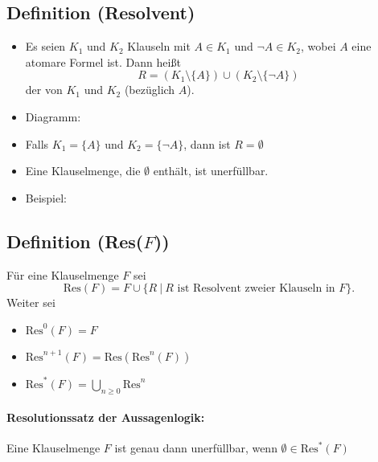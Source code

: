 \documentclass[a4paper,twoside,DIV15,BCOR12mm]{scrbook}
\begin{document}
\subsection{Definition (Resolvent)}
\begin{itemize}
\item Es seien $K_1$ und $K_2$ Klauseln mit $A\in K_1$ und $\neg A \in K_2$, 
    wobei $A$ eine atomare Formel ist. Dann heißt 
    $$ R=(K_1 \setminus \{A\}) \cup (K_2 \setminus \{\neg A\}) $$ der  von 
    $K_1$ und $K_2$ (bezüglich $A$).
\item Diagramm: \\

\item Falls $K_1 =\{A\}$ und $K_2=\{\neg A\}$, dann ist $R= \emptyset$
\item Eine Klauselmenge, die $\emptyset$ enthält, ist unerfüllbar. 
\item Beispiel:\\
\end{itemize}


\subsection{Definition (Res($F$))}
Für eine Klauselmenge $F$ sei
	$$ \mbox{Res}(F) = F\cup\{R\ |\ R \mbox{ ist Resolvent zweier Klauseln in $F$}\}.$$
Weiter sei
\begin{itemize}
\item $\mbox{Res}^0(F) = F$
\item $\mbox{Res}^{n+1}(F) = \mbox{Res}(\mbox{Res}^n(F))$
\item $\mbox{Res}^{\ast}(F) = \bigcup_{n\geq 0} \mbox{Res}^n$
\end{itemize} 

\paragraph{Resolutionssatz der Aussagenlogik:} Eine Klauselmenge $F$ ist genau dann
unerfüllbar, wenn $\emptyset \in \mbox{Res}^\ast (F)$
\end{document}
